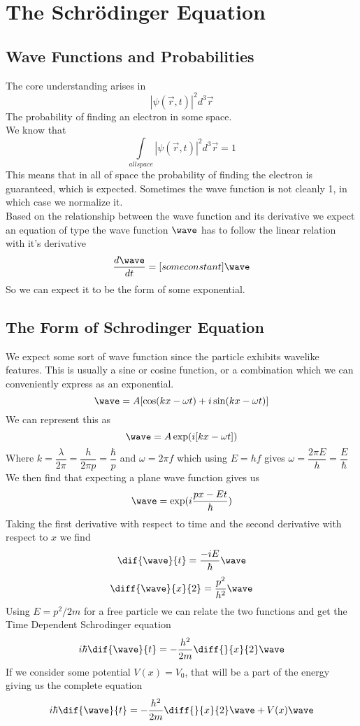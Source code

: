 \chapter{The Schr\"{o}dinger Equation}
\section{Wave Functions and Probabilities}
The core understanding arises in 
\[ |\psi(\vec{r}, t)|^2 d^3 \vec{r} \]
The probability of finding an electron in some space. \\
We know that 
\[ \int \limits_{all space} |\psi(\vec{r}, t)|^2 d^3 \vec{r}  = 1 \]
This means that in all of space the probability of finding the electron is guaranteed, which is expected. Sometimes the wave function is not cleanly 1, in which case we normalize it. \\
Based on the relationship between the wave function and its derivative we expect an equation of type the wave function $ \wave $ has to follow the linear relation with it's derivative
\[ \frac{d \wave}{dt} = [some constant] \wave \]
So we can expect it to be the form of some exponential.
\section{The Form of Schrodinger Equation}

We expect some sort of wave function since the particle exhibits wavelike features. This is usually a sine or cosine function, or a combination which we can conveniently express as an exponential. 
\[ \wave = A [ \cos(kx - \omega t) + i \sin(kx - \omega t) ] \]
We can represent this as
\[ \wave = A\exp(i[kx - \omega t]) \]
Where $ k = \dfrac{\lambda}{2 \pi} = \dfrac{h}{2 \pi p} = \dfrac{\hbar}{p}$ and $ \omega = 2 \pi f $ which using $ E = hf $ gives $ \omega = \dfrac{2 \pi E}{h} = \dfrac{E}{\hbar} $
We then find that expecting a plane wave function gives us 
\[ \wave = \exp(i\frac{px-Et}{\hbar}) \]
Taking the first derivative with respect to time and the second derivative with respect to $ x $ we find
\[ \dif{\wave}{t} =  \frac{-iE}{\hbar} \wave\]
\[ \diff{\wave}{x}{2} = \frac{p^2}{h^2} \wave\]
Using $ E = p^2/2m $ for a free particle we can relate the two functions and get the Time Dependent Schrodinger equation
\[ i\hbar \dif{\wave}{t} = -\frac{h^2}{2m} \diff{}{x}{2} \wave \]
If we consider some potential $ V(x) = V_0 $, that will be a part of the energy giving us the complete equation
\[ i\hbar \dif{\wave}{t} = -\frac{h^2}{2m} \diff{}{x}{2} \wave + V(x)\wave\]

